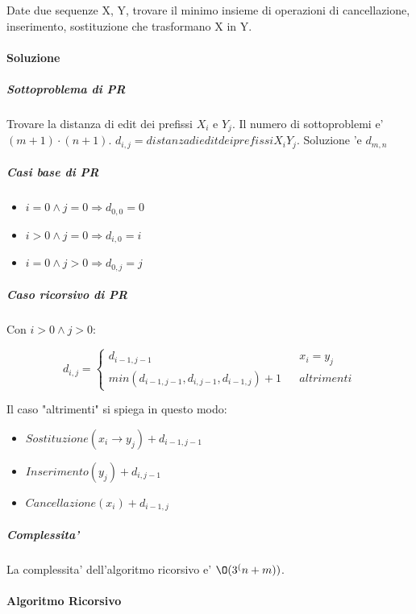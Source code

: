 Date due sequenze X, Y, trovare il minimo insieme di operazioni di cancellazione, inserimento, sostituzione che trasformano X in Y.

\paragraph{Soluzione}

\subparagraph{Sottoproblema di PR}

Trovare la distanza di edit dei prefissi $X_i$ e $Y_j$.
Il numero di sottoproblemi e' $(m+1) \cdot (n+1)$.
$d_{i,j} = distanza di edit dei prefissi X_i Y_j$.
Soluzione 'e $d_{m, n}$

\subparagraph{Casi base di PR}

\begin{itemize}
    \item $i = 0 \land j = 0 \Rightarrow d_{0,0} = 0$
    \item $i > 0 \land j = 0 \Rightarrow d_{i,0} = i$
    \item $i = 0 \land j > 0 \Rightarrow d_{0,j} = j$
\end{itemize}

\subparagraph{Caso ricorsivo di PR}

Con $i > 0 \land j > 0$:

\[
    \text{$d_{i,j}$} =
    \begin{cases}
      \text{$d_{i-1, j-1}$} && \text{$x_i = y_j$} \\
      \text{$min(d_{i-1, j-1}, d_{i, j-1}, d_{i-1, j}) + 1$} && altrimenti
    \end{cases}
\]

Il caso "altrimenti" si spiega in questo modo:
\begin{itemize}
    \item $Sostituzione(x_i \rightarrow y_j) + d_{i-1, j-1}$
    \item $Inserimento(y_j) + d_{i,j-1}$
    \item $Cancellazione(x_i) + d_{i-1, j}$
\end{itemize}

\subparagraph{Complessita'}

La complessita' dell'algoritmo ricorsivo e' $\O(3^(n+m))$.

\paragraph{Algoritmo Ricorsivo}

